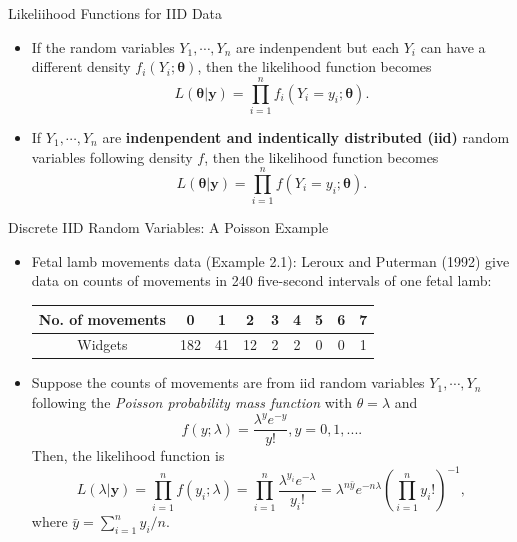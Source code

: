 \documentclass{beamer}
\begin{document}
    \begin{frame}{Likeliihood Functions for IID Data}
        \begin{itemize}
            \item If the random variables $Y_{1}, \cdots, Y_{n}$ are indenpendent but each $Y_{i}$ can have a different density $f_{i}(Y_{i}; \boldsymbol{\theta})$, then the likelihood function becomes 
$$L(\boldsymbol{\theta}| \boldsymbol{y}) = \prod^{n}_{i=1}f_{i}(Y_{i} = y_{i};\boldsymbol{\theta}).$$
             \item If $Y_{1}, \cdots, Y_{n}$ are {\bf indenpendent and indentically distributed (iid)} random variables following density $f$, then the likelihood function becomes 
$$L(\boldsymbol{\theta}| \boldsymbol{y}) = \prod^{n}_{i=1}f(Y_{i} = y_{i};\boldsymbol{\theta}).$$
        \end{itemize}
    \end{frame}
    
        \begin{frame}{Discrete IID Random Variables: A Poisson Example}
        \begin{itemize}
            \item Fetal lamb movements data (Example 2.1): Leroux and Puterman (1992) give data on counts of movements in 240 five-second intervals of one fetal lamb:
            \begin{table}
\centering
\begin{tabular}{c|cccccccc}
No. of movements & 0 & 1 & 2 & 3 & 4 & 5 & 6 & 7 \\\hline
Widgets & 182 & 41 & 12 & 2 & 2 & 0 & 0 & 1 \\
\end{tabular}
\end{table}
    \item Suppose the counts of movements are from iid random variables $Y_{1}, \cdots, Y_{n}$  following the {\it Poisson probability mass function} with $\theta = \lambda$ and 
$$f(y;\lambda) = \frac{\lambda^{y}e^{-y}}{y!}, y = 0, 1, ....$$ 
Then, the likelihood function is 
$$L(\lambda|\boldsymbol{y}) = \prod^{n}_{i=1} f(y_{i};\lambda) = \prod^{n}_{i=1} \frac{\lambda^{{y}_{i}}e^{-\lambda}}{ y_{i}!} = \lambda^{n\bar{y}}e^{-n\lambda}\left( \prod^{n}_{i=1} y_{i}!   \right)^{-1},$$
where $\bar{y} = \sum^{n}_{i=1} y_{i}/n$.
        \end{itemize}
    \end{frame}
    
    
\end{document}
